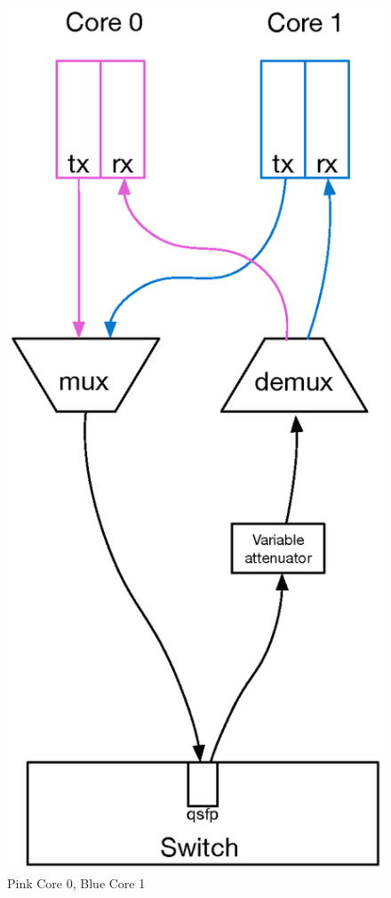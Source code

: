 \documentclass{article}
\begin{document}
{\begin{figure}[h!]
\begin{minipage}{.5\textwidth}
		\includegraphics[width = .6\linewidth]{pinkbluecore1varrxcom.eps}
		\caption{Pink Core 0, Blue Core 1}
		\label{fig:bluecore1}
	\end{minipage}
\end{figure}

}
\end{document}
